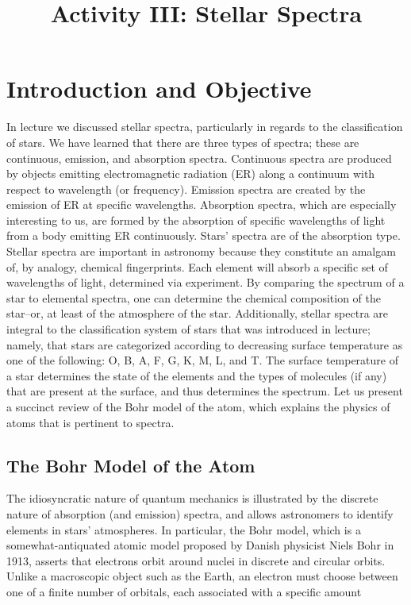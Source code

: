 \documentclass[12pt]{article}
\begin{document}
\title{Activity III: Stellar Spectra}
\maketitle

\graphicspath{ {./images/} }

\section{Introduction and Objective}

In lecture we discussed stellar spectra, particularly in regards to the classification of stars. We have learned that there are three types of spectra; these
are continuous, emission, and absorption spectra. Continuous spectra are produced by objects emitting electromagnetic radiation (ER) along a continuum
with respect to wavelength (or frequency). Emission spectra are created by the
emission of ER at specific wavelengths. Absorption spectra, which are especially interesting to us, are formed by the absorption of specific wavelengths of light from a body emitting ER continuously. Stars’ spectra are of the absorption type.\newline
Stellar spectra are important in astronomy because they constitute an amalgam
of, by analogy, chemical fingerprints. Each element will absorb a specific set of wavelengths of light, determined via experiment. By comparing the spectrum of a star to elemental spectra, one can determine the chemical composition of the star–or, at least of the atmosphere of the star. Additionally, stellar spectra are integral to the classification system of stars that was introduced in lecture; namely, that stars are categorized according to decreasing surface temperature as one of the following: O, B, A, F, G, K, M, L, and T. The surface temperature of a star determines the state of the elements and the types of molecules (if any) that are present at the surface, and thus determines the spectrum. Let us present a succinct review of the Bohr model of the atom, which explains the physics of atoms that is pertinent to spectra.


\subsection{The Bohr Model of the Atom}

The idiosyncratic nature of quantum mechanics is illustrated by the discrete
nature of absorption (and emission) spectra, and allows astronomers to identify elements in stars’ atmospheres. In particular, the Bohr model, which is a
somewhat-antiquated atomic model proposed by Danish physicist Niels Bohr in
1913, asserts that electrons orbit around nuclei in discrete and circular orbits.
Unlike a macroscopic object such as the Earth, an electron must choose between one of a finite number of orbitals, each associated with a specific amount
\end{document}
